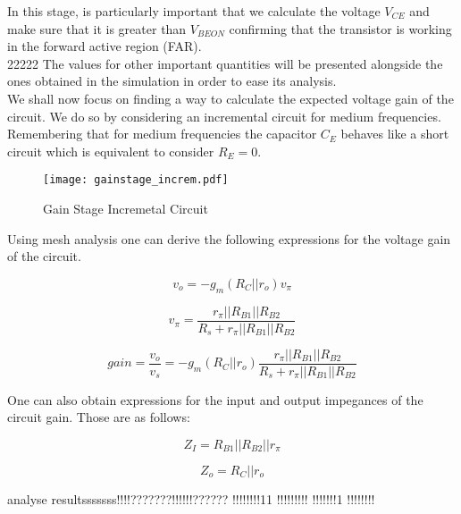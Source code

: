 In this stage, is particularly important that we calculate the voltage $V_{CE}$ and make sure that it is greater than $V_{BEON}$ confirming that the transistor is working in the forward active region (FAR).\\

22222 The values for other important quantities will be presented alongside the ones obtained in the simulation in order to ease its analysis.\\

We shall now focus on finding a way to calculate the expected voltage gain of the circuit. We do so by considering an incremental circuit for medium frequencies. Remembering that for medium frequencies the capacitor $C_E$ behaves like a short circuit which is equivalent to consider $R_E=0$.

\begin{figure}[h!]
\centering
\texttt{[image: gainstage\_increm.pdf]}
\caption{Gain Stage Incremetal Circuit}
\label{fig:gain_stage_incremetal_circuit}
\end{figure}

Using mesh analysis one can derive the following expressions for the voltage gain of the circuit.

\begin{equation}
v_o=-g_m(R_C||r_o)v_{\pi}
\end{equation}

\begin{equation}
v_{\pi}=\frac{r_{\pi}||R_{B1}||R_{B2}}{R_s+r_{\pi}||R_{B1}||R_{B2}}
\end{equation}

\begin{equation}
gain=\frac{v_o}{v_s}=-g_m(R_C||r_o)\frac{r_{\pi}||R_{B1}||R_{B2}}{R_s+r_{\pi}||R_{B1}||R_{B2}}
\end{equation}

One can also obtain expressions for the input and output impegances of the circuit gain. Those are as follows:


\begin{equation}
Z_I=R_{B1}||R_{B2}||r_{\pi}
\end{equation}

\begin{equation}
Z_o=R_C||r_o
\end{equation}



analyse resultsssssss!!!!???????!!!!!!??????
!!!!!!!!11
!!!!!!!!!
!!!!!!!1
!!!!!!!!



